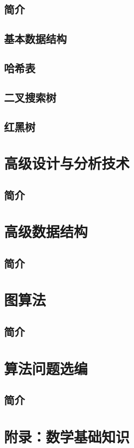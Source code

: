 \documentclass[lang=cn,newtx,10pt,scheme=chinese]{elegantbook}
\begin{document}
\chapter{简介}

\chapter{基本数据结构}

\chapter{哈希表}

\chapter{二叉搜索树}

\chapter{红黑树}

\part{高级设计与分析技术}

\chapter{简介}

\part{高级数据结构}

\chapter{简介}

\part{图算法}

\chapter{简介}

\part{算法问题选编}

\chapter{简介}

\part{附录：数学基础知识}
\end{document}
